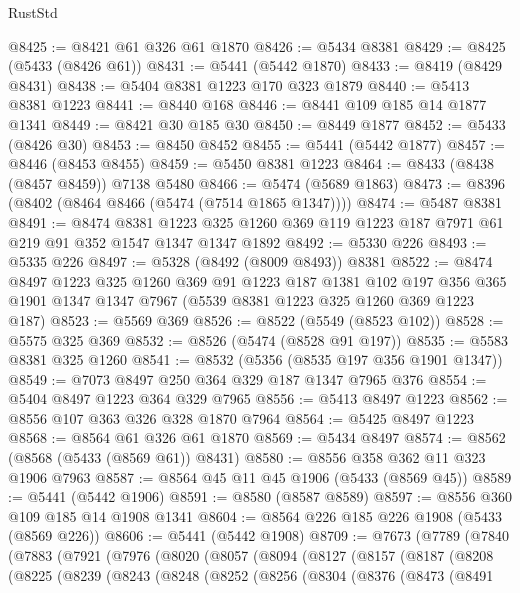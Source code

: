 \begin{lexlean}{RustStd}
\begin{coremodule}
@8425 := @8421 @61 @326 @61 @1870
@8426 := @5434 @8381
@8429 := @8425 (@5433 (@8426 @61))
@8431 := @5441 (@5442 @1870)
@8433 := @8419 (@8429 @8431)
@8438 := @5404 @8381 @1223 @170 @323 @1879
@8440 := @5413 @8381 @1223
@8441 := @8440 @168
@8446 := @8441 @109 @185 @14 @1877 @1341
@8449 := @8421 @30 @185 @30
@8450 := @8449 @1877
@8452 := @5433 (@8426 @30)
@8453 := @8450 @8452
@8455 := @5441 (@5442 @1877)
@8457 := @8446 (@8453 @8455)
@8459 := @5450 @8381 @1223
@8464 := @8433 (@8438 (@8457 @8459)) @7138 @5480
@8466 := @5474 (@5689 @1863)
@8473 := @8396 (@8402 (@8464 @8466 (@5474 (@7514 @1865 @1347))))
@8474 := @5487 @8381
@8491 := @8474
    @8381
    @1223
    @325
    @1260
    @369
    @119
    @1223
    @187
    @7971
    @61
    @219
    @91
    @352
    @1547
    @1347
    @1347
    @1892
@8492 := @5330 @226
@8493 := @5335 @226
@8497 := @5328 (@8492 (@8009 @8493)) @8381
@8522 := @8474
    @8497
    @1223
    @325
    @1260
    @369
    @91
    @1223
    @187
    @1381
    @102
    @197
    @356
    @365
    @1901
    @1347
    @1347
    @7967
    (@5539 @8381 @1223 @325 @1260 @369 @1223 @187)
@8523 := @5569 @369
@8526 := @8522 (@5549 (@8523 @102))
@8528 := @5575 @325 @369
@8532 := @8526 (@5474 (@8528 @91 @197))
@8535 := @5583 @8381 @325 @1260
@8541 := @8532 (@5356 (@8535 @197 @356 @1901 @1347))
@8549 := @7073 @8497 @250 @364 @329 @187 @1347 @7965 @376
@8554 := @5404 @8497 @1223 @364 @329 @7965
@8556 := @5413 @8497 @1223
@8562 := @8556 @107 @363 @326 @328 @1870 @7964
@8564 := @5425 @8497 @1223
@8568 := @8564 @61 @326 @61 @1870
@8569 := @5434 @8497
@8574 := @8562 (@8568 (@5433 (@8569 @61)) @8431)
@8580 := @8556 @358 @362 @11 @323 @1906 @7963
@8587 := @8564 @45 @11 @45 @1906 (@5433 (@8569 @45))
@8589 := @5441 (@5442 @1906)
@8591 := @8580 (@8587 @8589)
@8597 := @8556 @360 @109 @185 @14 @1908 @1341
@8604 := @8564 @226 @185 @226 @1908 (@5433 (@8569 @226))
@8606 := @5441 (@5442 @1908)
@8709 := @7673
    (@7789
      (@7840
        (@7883
          (@7921
            (@7976
              (@8020
                (@8057
                  (@8094
                    (@8127
                      (@8157
                        (@8187
                          (@8208
                            (@8225
                              (@8239
                                (@8243
                                  (@8248
                                    (@8252
                                      (@8256
                                        (@8304
                                          (@8376
                                            (@8473
                                              (@8491

\end{coremodule}
\end{lexlean}
